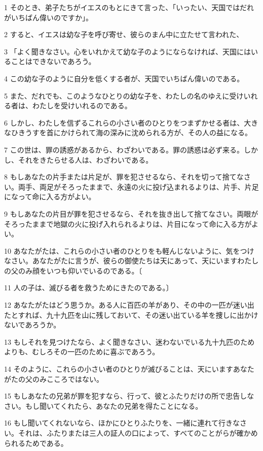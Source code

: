 \par 1 そのとき、弟子たちがイエスのもとにきて言った、「いったい、天国ではだれがいちばん偉いのですか」。
\par 2 すると、イエスは幼な子を呼び寄せ、彼らのまん中に立たせて言われた、
\par 3 「よく聞きなさい。心をいれかえて幼な子のようにならなければ、天国にはいることはできないであろう。
\par 4 この幼な子のように自分を低くする者が、天国でいちばん偉いのである。
\par 5 また、だれでも、このようなひとりの幼な子を、わたしの名のゆえに受けいれる者は、わたしを受けいれるのである。
\par 6 しかし、わたしを信ずるこれらの小さい者のひとりをつまずかせる者は、大きなひきうすを首にかけられて海の深みに沈められる方が、その人の益になる。
\par 7 この世は、罪の誘惑があるから、わざわいである。罪の誘惑は必ず来る。しかし、それをきたらせる人は、わざわいである。
\par 8 もしあなたの片手または片足が、罪を犯させるなら、それを切って捨てなさい。両手、両足がそろったままで、永遠の火に投げ込まれるよりは、片手、片足になって命に入る方がよい。
\par 9 もしあなたの片目が罪を犯させるなら、それを抜き出して捨てなさい。両眼がそろったままで地獄の火に投げ入れられるよりは、片目になって命に入る方がよい。
\par 10 あなたがたは、これらの小さい者のひとりをも軽んじないように、気をつけなさい。あなたがたに言うが、彼らの御使たちは天にあって、天にいますわたしの父のみ顔をいつも仰いでいるのである。〔
\par 11 人の子は、滅びる者を救うためにきたのである。〕
\par 12 あなたがたはどう思うか。ある人に百匹の羊があり、その中の一匹が迷い出たとすれば、九十九匹を山に残しておいて、その迷い出ている羊を捜しに出かけないであろうか。
\par 13 もしそれを見つけたなら、よく聞きなさい、迷わないでいる九十九匹のためよりも、むしろその一匹のために喜ぶであろう。
\par 14 そのように、これらの小さい者のひとりが滅びることは、天にいますあなたがたの父のみこころではない。
\par 15 もしあなたの兄弟が罪を犯すなら、行って、彼とふたりだけの所で忠告しなさい。もし聞いてくれたら、あなたの兄弟を得たことになる。
\par 16 もし聞いてくれないなら、ほかにひとりふたりを、一緒に連れて行きなさい。それは、ふたりまたは三人の証人の口によって、すべてのことがらが確かめられるためである。

